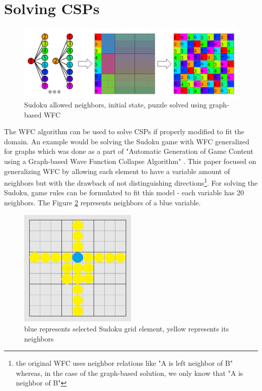 \documentclass[shortabstract, english, inz]{iithesis}
\begin{document}
\section{Solving CSPs}
\begin{figure}[H]
\centering
\includegraphics[width=1\textwidth, angle=0]{images/sudoku_solver.png}
\caption{Sudoku allowed neighbors, initial state, puzzle solved using graph-based WFC \cite{GraphBased}}
\label{fig:sudoku_solver}
\end{figure}
The WFC algorithm can be used to solve CSPs if properly modified to fit the domain. An example would be solving the Sudoku game with WFC generalized for graphs which was done as a part of "Automatic Generation of Game Content using a Graph-based Wave Function Collapse Algorithm" \cite{GraphBased}. This paper focused on generalizing WFC by allowing each element to have a variable amount of neighbors but with the drawback of not distinguishing directions\footnote{the original WFC uses neighbor relations like "A is left neighbor of B" whereas, in the  case of the graph-based solution, we only know that "A is neighbor of B"}. For solving the Sudoku, game rules can be formulated to fit this model - each variable has 20 neighbors. The Figure \ref{fig:sudoku_neighbors} represents neighbors of a blue variable.
\begin{figure}[H]
\centering
\includegraphics[width=0.5\textwidth, angle=0]{images/sudoku_neighbors.png}
\caption{blue represents selected Sudoku grid element, yellow represents its neighbors}
\label{fig:sudoku_neighbors}
\end{figure}
\end{document}
